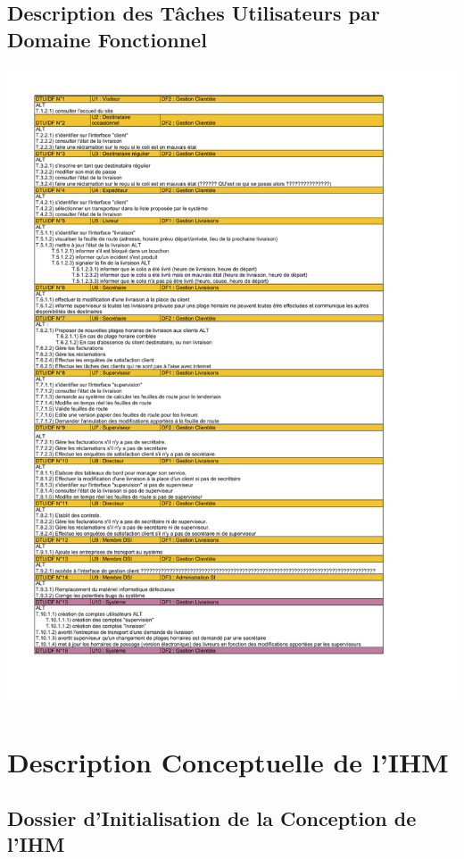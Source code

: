 \documentclass{report}
\begin{document}
\section{Description des Tâches Utilisateurs par Domaine Fonctionnel}

\includegraphics[scale = 0.8]{images/DTUDF.pdf}



\chapter{Description Conceptuelle de l'IHM}


\section{Dossier d'Initialisation de la Conception de l'IHM}
\end{document}
